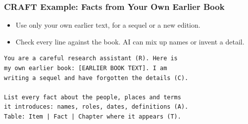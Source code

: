 \begin{frame}[fragile]\frametitle{CRAFT Example: Facts from Your Own Earlier Book}
\begin{itemize}
\item Use only your own earlier text, for a sequel or a new edition.
\item Check every line against the book. AI can mix up names or invent a detail.
\end{itemize}
\begin{lstlisting}[language=HTML]
You are a careful research assistant (R). Here is
my own earlier book: [EARLIER BOOK TEXT]. I am
writing a sequel and have forgotten the details (C).

List every fact about the people, places and terms
it introduces: names, roles, dates, definitions (A).
Table: Item | Fact | Chapter where it appears (T).
\end{lstlisting}
\end{frame}
